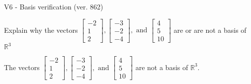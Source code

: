 \begin{exercise}
  \begin{exerciseTitle}V6 - Basis verification (ver. 862)\end{exerciseTitle}
  \begin{exerciseStatement}
    Explain why the vectors \(\left[\begin{array}{r}
-2 \\
1 \\
2
\end{array}\right] , \left[\begin{array}{r}
-3 \\
-2 \\
-4
\end{array}\right] , \text{ and } \left[\begin{array}{r}
4 \\
5 \\
10
\end{array}\right]\) are or are not a basis of \(\mathbb{R}^3\)	


  \end{exerciseStatement}
  \begin{exerciseAnswer}
   The vectors \(\left[\begin{array}{r}
-2 \\
1 \\
2
\end{array}\right] , \left[\begin{array}{r}
-3 \\
-2 \\
-4
\end{array}\right] , \text{ and } \left[\begin{array}{r}
4 \\
5 \\
10
\end{array}\right]\) 
  	 are not  a basis of \(\mathbb{R}^3\).
  


  \end{exerciseAnswer}
\end{exercise}